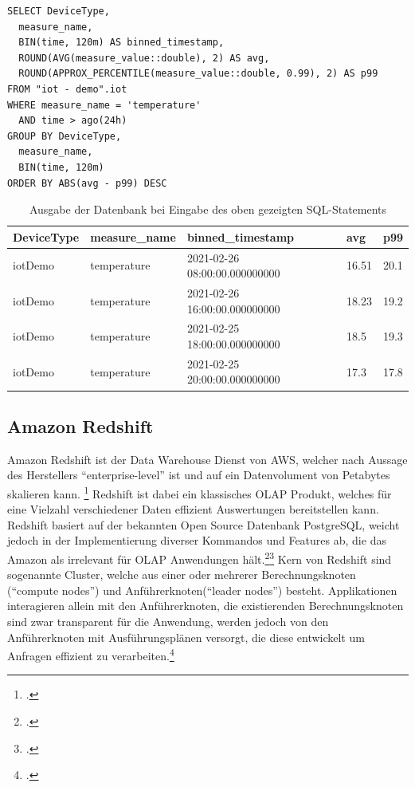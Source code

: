 \begin{lstlisting}[caption={Berechnung des 99. Perzentils in Timestream},label=lst:sql-timestream, captionpos=b]
SELECT DeviceType,
  measure_name,
  BIN(time, 120m) AS binned_timestamp,
  ROUND(AVG(measure_value::double), 2) AS avg,
  ROUND(APPROX_PERCENTILE(measure_value::double, 0.99), 2) AS p99 
FROM "iot - demo".iot 
WHERE measure_name = 'temperature' 
  AND time > ago(24h) 
GROUP BY DeviceType,
  measure_name,
  BIN(time, 120m) 
ORDER BY ABS(avg - p99) DESC
\end{lstlisting}

\begin{table}[H]
\centering
\begin{tabular}{|l|l|l|l|l|}
\hline
DeviceType & measure\_name & binned\_timestamp & avg & p99 \\ \hline
iotDemo & temperature & 2021-02-26 08:00:00.000000000 & 16.51 & 20.1 \\ \hline
iotDemo & temperature & 2021-02-26 16:00:00.000000000 & 18.23 & 19.2 \\ \hline
iotDemo & temperature & 2021-02-25 18:00:00.000000000 & 18.5 & 19.3 \\ \hline
iotDemo & temperature & 2021-02-25 20:00:00.000000000 & 17.3 & 17.8 \\ \hline
\end{tabular}
\caption{Ausgabe der Datenbank bei Eingabe des oben gezeigten SQL-Statements}
\label{tab:AusgabeSQL}
\end{table}

\subsection{Amazon Redshift}
Amazon Redshift ist der Data Warehouse Dienst von \ac{AWS}, welcher nach Aussage des Herstellers \enquote{enterprise-level} ist und auf ein Datenvolument von Petabytes skalieren kann. \footcite[Vgl.][1]{AmazonWebServicesInc..o.J.g} Redshift ist dabei ein klassisches \ac{OLAP} Produkt, welches für eine Vielzahl verschiedener Daten effizient Auswertungen bereitstellen kann. Redshift basiert auf der bekannten Open Source Datenbank PostgreSQL, weicht jedoch in der Implementierung diverser Kommandos und Features ab, die das Amazon als irrelevant für \ac{OLAP} Anwendungen hält.\footcite[Vgl.][4]{AmazonWebServicesInc..o.J.g}\nzitat\footcite[Vgl.][428\psqq]{AmazonWebServicesInc..o.J.g} Kern von Redshift sind sogenannte Cluster, welche aus einer oder mehrerer Berechnungsknoten (\enquote{compute nodes}) und Anführerknoten(\enquote{leader nodes}) besteht. Applikationen interagieren allein mit den Anführerknoten, die existierenden Berechnungsknoten sind zwar transparent für die Anwendung, werden jedoch von den Anführerknoten mit Ausführungsplänen versorgt, die diese entwickelt um Anfragen effizient zu verarbeiten.\footcite[Vgl.][4]{AmazonWebServicesInc..o.J.g}


